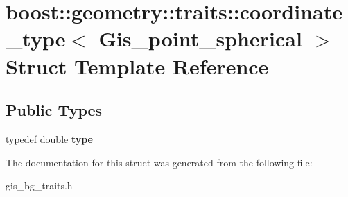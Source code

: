 \hypertarget{structboost_1_1geometry_1_1traits_1_1coordinate__type_3_01Gis__point__spherical_01_4}{}\section{boost\+:\+:geometry\+:\+:traits\+:\+:coordinate\+\_\+type$<$ Gis\+\_\+point\+\_\+spherical $>$ Struct Template Reference}
\label{structboost_1_1geometry_1_1traits_1_1coordinate__type_3_01Gis__point__spherical_01_4}
\subsection*{Public Types}
\begin{DoxyCompactItemize}
\item 
\mbox{\label{structboost_1_1geometry_1_1traits_1_1coordinate__type_3_01Gis__point__spherical_01_4_a5263a0a938f1d28388fb6d38cf6b6324}} 
typedef double {\bfseries type}
\end{DoxyCompactItemize}


The documentation for this struct was generated from the following file\+:\begin{DoxyCompactItemize}
\item 
gis\+\_\+bg\+\_\+traits.\+h\end{DoxyCompactItemize}
